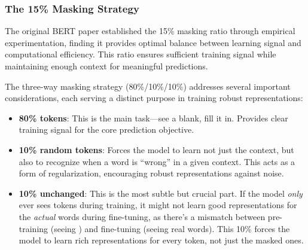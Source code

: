 \subsubsection{The 15\% Masking Strategy}

The original BERT paper established the 15\% masking ratio through empirical experimentation, finding it provides optimal balance between learning signal and computational efficiency. This ratio ensures sufficient training signal while maintaining enough context for meaningful predictions.

The three-way masking strategy (80\%/10\%/10\%) addresses several important considerations, each serving a distinct purpose in training robust representations:
\begin{itemize}
\item \textbf{80\% \mask{} tokens}: This is the main task---see a blank, fill it in. Provides clear training signal for the core prediction objective.
\item \textbf{10\% random tokens}: Forces the model to learn not just the context, but also to recognize when a word is ``wrong'' in a given context. This acts as a form of regularization, encouraging robust representations against noise.
\item \textbf{10\% unchanged}: This is the most subtle but crucial part. If the model \emph{only} ever sees \mask{} tokens during training, it might not learn good representations for the \emph{actual} words during fine-tuning, as there's a mismatch between pre-training (seeing \mask{}) and fine-tuning (seeing real words). This 10\% forces the model to learn rich representations for every token, not just the masked ones.
\end{itemize}

